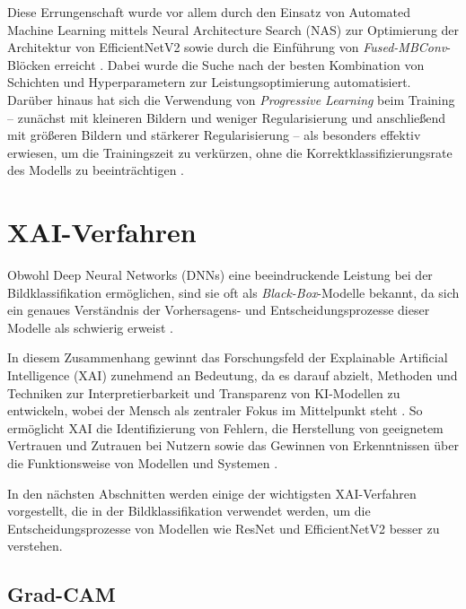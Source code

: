 Diese Errungenschaft wurde vor allem durch den Einsatz von Automated Machine Learning mittels Neural Architecture Search (NAS) zur Optimierung der Architektur von EfficientNetV2 sowie durch die Einführung von \textit{Fused-MBConv}-Blöcken erreicht \cite{tan2021efficientnetv2}. Dabei wurde die Suche nach der besten Kombination von Schichten und Hyperparametern zur Leistungsoptimierung automatisiert. Darüber hinaus hat sich die Verwendung von \textit{Progressive Learning} beim Training – zunächst mit kleineren Bildern und weniger Regularisierung und anschließend mit größeren Bildern und stärkerer Regularisierung – als besonders effektiv erwiesen, um die Trainingszeit zu verkürzen, ohne die Korrektklassifizierungsrate des Modells zu beeinträchtigen \cite{tan2021efficientnetv2}.

\section{XAI-Verfahren}

Obwohl Deep Neural Networks (DNNs) eine beeindruckende Leistung bei der Bildklassifikation ermöglichen, sind sie oft als \textit{Black-Box}-Modelle bekannt, da sich ein genaues Verständnis der Vorhersagens- und Entscheidungsprozesse dieser Modelle als schwierig erweist \cite{selvaraju2017gradcam}.

In diesem Zusammenhang gewinnt das Forschungsfeld der Explainable Artificial Intelligence (XAI) zunehmend an Bedeutung, da es darauf abzielt, Methoden und Techniken zur Interpretierbarkeit und Transparenz von KI-Modellen zu entwickeln, wobei der Mensch als zentraler Fokus im Mittelpunkt steht \cite{selvaraju2017gradcam}. So ermöglicht XAI die Identifizierung von Fehlern, die Herstellung von geeignetem Vertrauen und Zutrauen bei Nutzern sowie das Gewinnen von Erkenntnissen über die Funktionsweise von Modellen und Systemen \cite{selvaraju2017gradcam}.

In den nächsten Abschnitten werden einige der wichtigsten XAI-Verfahren vorgestellt, die in der Bildklassifikation verwendet werden, um die Entscheidungsprozesse von Modellen wie ResNet und EfficientNetV2 besser zu verstehen.

\subsection{Grad-CAM}

